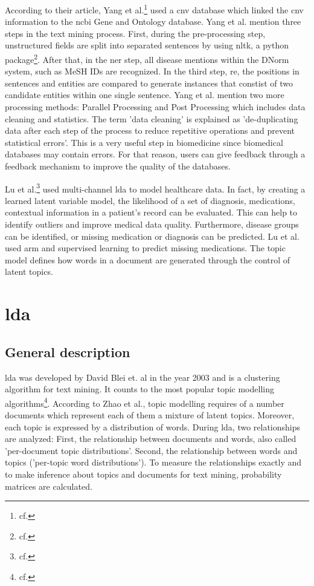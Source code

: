 According to their article, Yang et al.\footnote{cf.\autocite{yang_2018}} used a \gls{cnv} database which linked the \gls{cnv} information to the \gls{ncbi} Gene and Ontology database. Yang et al. mention three steps in the text mining process. First, during the pre-processing step, unstructured fields are split into separated sentences by using \gls{nltk}, a python package\footnote{cf.\autocite{nltk}}. After that, in the \gls{ner} step, all disease mentions within the DNorm system, such as MeSH IDs are recognized. In the third step, \gls{re}, the positions in sentences and entities are compared to generate instances that constist of two candidate entities within one single sentence.
Yang et al. mention two more processing methods: Parallel Processing and Post Processing which includes data cleaning and statistics. The term 'data cleaning' is explained as 'de-duplicating data after each step of the process to reduce repetitive operations and prevent statistical errors'. This is a very useful step in biomedicine since biomedical databases may contain errors. For that reason, users can give feedback through a feedback mechanism to improve the quality of the databases.

Lu et al.\footnote{cf.\autocite{lu_2016}} used multi-channel \gls{lda} to model healthcare data. In fact, by creating a learned latent variable model, the likelihood of a set of diagnosis, medications, contextual information in a patient's record can be evaluated. This can help to identify outliers and improve medical data quality. Furthermore, disease groups can be identified,  or missing medication or diagnosis can be predicted. Lu et al. used \gls{arm} and supervised learning to predict missing medications. The topic model defines how words in a document are generated through the control of latent topics.

\chapter{\gls{lda}}\label{lda}
\section{General description}\label{lda_description}
\gls{lda} was developed by David Blei et. al in the year 2003 and is a clustering algorithm for text mining. It counts to the most popular topic modelling algorithms\footnote{cf.\autocite{zhao_2016}}.
According to Zhao et al., topic modelling requires of a number documents which represent each of them a mixture of latent topics. Moreover, each topic is expressed by a distribution of words. During \gls{lda}, two relationships are analyzed: First, the relationship between documents and words, also called 'per-document topic distributions'. Second, the relationship between words and topics ('per-topic word distributions'). To measure the relationships exactly and to make inference about topics and documents for text mining, probability matrices are calculated.

